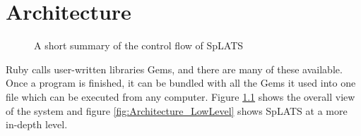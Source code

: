 \chapter{Architecture}

\begin{center}
\begin{figure}
\caption{A short summary of the control flow of SpLATS}
\label{fig:Architecture_HighLevel}
\end{figure}
\end{center}

  Ruby calls user-written libraries Gems, and there are many of these available. Once a program is finished, it can be bundled with all the Gems it used into one file which can be executed from any computer.
  Figure \ref{fig:Architecture_HighLevel} shows the overall view of the system and figure \ref{fig:Architecture_LowLevel} shows SpLATS at a more in-depth level.

